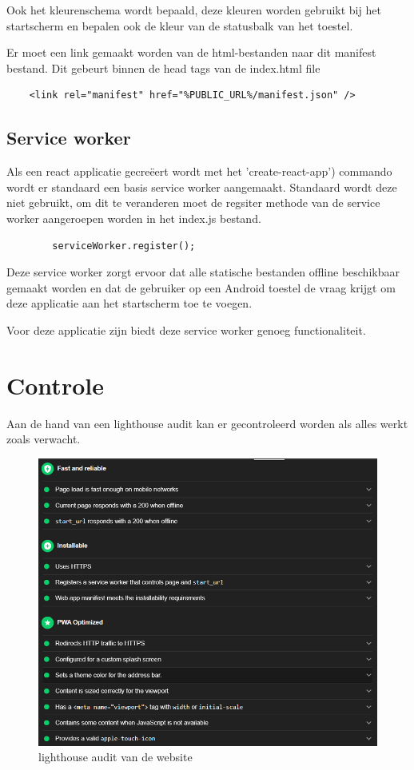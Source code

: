 		Ook het kleurenschema wordt bepaald, deze kleuren worden gebruikt bij het startscherm en bepalen ook de kleur van de statusbalk van het toestel. 
		
		Er moet een link gemaakt worden van de html-bestanden naar dit manifest bestand. Dit gebeurt binnen de head tags van de index.html file
		
\begin{lstlisting}
	<link rel="manifest" href="%PUBLIC_URL%/manifest.json" />
\end{lstlisting}
		
		
	\subsection{Service worker}
		
		Als een react applicatie gecreëert wordt met het 'create-react-app') commando wordt er standaard een basis service worker aangemaakt. Standaard wordt deze niet gebruikt, om dit te veranderen moet de regsiter methode van de service worker aangeroepen worden in het index.js bestand.
		
\begin{lstlisting}
		serviceWorker.register();
\end{lstlisting}
		
		Deze service worker zorgt ervoor dat alle statische bestanden offline beschikbaar gemaakt worden en dat de gebruiker op een Android toestel de vraag krijgt om deze applicatie aan het startscherm toe te voegen.
		
		Voor deze applicatie zijn biedt deze service worker genoeg functionaliteit.
		

\section{Controle}

	Aan de hand van een lighthouse audit kan er gecontroleerd worden als alles werkt zoals verwacht.
	
	\begin{figure}[H]
		\centering
		\includegraphics{./img/lighthouse_dart.png}{}
		\caption{lighthouse audit van de website}
	\end{figure}

